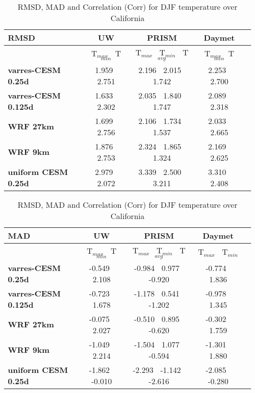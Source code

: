 \begin{table}
\begin{center}
\caption{RMSD, MAD and Correlation (Corr) for DJF temperature over California} 
\begin{tabular}{lcccc}
\hline \textbf{RMSD} & \textbf{UW}  & \textbf{PRISM} & \textbf{Daymet} \\
\hline $    $ & T$_{max}$ $\     $  T$_{min}$ & T$_{max}$ $\     $  T$_{min}$ $\     $ T$_{avg}$& T$_{max}$ $\     $  T$_{min}$\\
\hline \textbf{varres-CESM 0.25d} & 1.959 $\ $ 2.751 & 2.196 $\ $ 2.015 $\ $ 1.742 & 2.253 $\ $ 2.700 \\
\textbf{varres-CESM 0.125d} & 1.633 $\ $ 2.302 & 2.035 $\ $ 1.840 $\ $ 1.747 & 2.089 $\ $ 2.318 \\
\textbf{WRF 27km} & 1.699 $\ $ 2.756 & 2.106 $\ $ 1.734 $\ $ 1.537 & 2.033 $\ $ 2.665 \\
\textbf{WRF 9km} & 1.876 $\ $ 2.753 & 2.324 $\ $ 1.865 $\ $ 1.324 & 2.169 $\ $ 2.625 \\
\textbf{uniform CESM 0.25d} & 2.979 $\ $ 2.072 & 3.339 $\ $ 2.500 $\ $ 3.211 & 3.310 $\ $ 2.408 \\
\hline
\end{tabular}

\begin{tabular}{lcccc}
\hline \textbf{MAD} & \textbf{UW}  & \textbf{PRISM} & \textbf{Daymet} \\
\hline $    $ & T$_{max}$ $\     $  T$_{min}$ & T$_{max}$ $\     $  T$_{min}$ $\     $ T$_{avg}$& T$_{max}$ $\     $  T$_{min}$\\
\hline \textbf{varres-CESM 0.25d} & -0.549 $\ $ 2.108 & -0.984 $\ $ 0.977 $\ $ -0.920 & -0.774 $\ $ 1.836 \\
\textbf{varres-CESM 0.125d} & -0.723 $\ $ 1.678 & -1.178 $\ $ 0.541 $\ $ -1.202 & -0.978 $\ $ 1.345 \\
\textbf{WRF 27km} & -0.075 $\ $ 2.027 & -0.510 $\ $ 0.895 $\ $ -0.620 & -0.302 $\ $ 1.759 \\
\textbf{WRF 9km} & -1.049 $\ $ 2.214 & -1.504 $\ $ 1.077 $\ $ -0.594 & -1.301 $\ $ 1.880 \\
\textbf{uniform CESM 0.25d} & -1.862 $\ $ -0.010 & -2.293 $\ $ -1.142 $\ $ -2.616 & -2.085 $\ $ -0.280 \\
\hline
\end{tabular}


\end{center}
\end{table}
